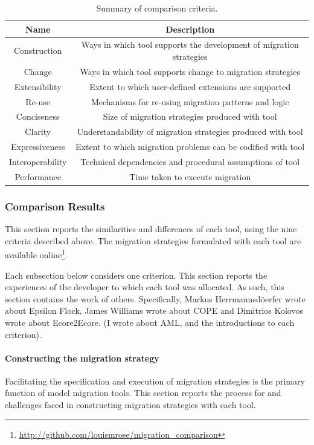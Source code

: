 \begin{table}[hbtp]
	\centering
	\caption{Summary of comparison criteria.}
	\label{tab:criteria}
	\begin{tabular}{|c|c|}
	\hline
	\textbf{Name}    & \textbf{Description} \\
	\hline
	Construction     & Ways in which tool supports the development of migration strategies \\
	\hline
	Change           & Ways in which tool supports change to migration strategies \\
	\hline
	Extensibility    & Extent to which user-defined extensions are supported \\
	\hline
	Re-use           & Mechanisms for re-using migration patterns and logic \\
	\hline
	Conciseness      & Size of migration strategies produced with tool \\
	\hline
	Clarity          & Understandability of migration strategies produced with tool \\
	\hline
	Expressiveness   & Extent to which migration problems can be codified with tool \\
	\hline
	Interoperability & Technical dependencies and procedural assumptions of tool \\
	\hline
	Performance      & Time taken to execute migration \\
	\hline
	\end{tabular}
\end{table}


\subsubsection{Comparison Results}
\label{sec:results}
This section reports the similarities and differences of each tool, using the nine criteria described above. The migration strategies formulated with each tool are available online\footnote{\url{http://github.com/louismrose/migration_comparison}}. 

Each subsection below considers one criterion. This section reports the experiences of the developer to which each tool was allocated. As such, this section contains the work of others. Specifically, Markus Herrmannsd\"{o}erfer wrote about Epsilon Flock, James Williams wrote about COPE and Dimitrios Kolovos wrote about Ecore2Ecore. (I wrote about AML, and the introductions to each criterion). 

\paragraph{Constructing the migration strategy}
\label{subsec:constructing}
Facilitating the specification and execution of migration strategies is the primary function of model migration tools. This section reports the process for and challenges faced in constructing migration strategies with each tool.

